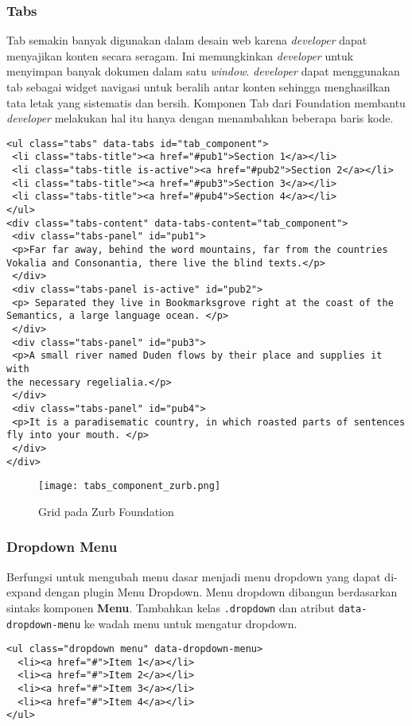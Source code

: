 \subsubsection{Tabs}
\label{subs:tabs_javascript_zurb}
Tab semakin banyak digunakan dalam desain web karena \textit{developer} dapat menyajikan konten secara seragam. Ini memungkinkan \textit{developer} untuk menyimpan banyak dokumen dalam satu \textit{window}. \textit{developer} dapat menggunakan tab sebagai widget navigasi untuk beralih antar konten sehingga menghasilkan tata letak yang sistematis dan bersih. Komponen Tab dari Foundation membantu \textit{developer} melakukan hal itu hanya dengan menambahkan beberapa baris kode. \cite{zurb:15:introfoundation}

\begin{lstlisting}[frame=single] 
<ul class="tabs" data-tabs id="tab_component">
 <li class="tabs-title"><a href="#pub1">Section 1</a></li>
 <li class="tabs-title is-active"><a href="#pub2">Section 2</a></li>
 <li class="tabs-title"><a href="#pub3">Section 3</a></li>
 <li class="tabs-title"><a href="#pub4">Section 4</a></li>
</ul>
<div class="tabs-content" data-tabs-content="tab_component">
 <div class="tabs-panel" id="pub1">
 <p>Far far away, behind the word mountains, far from the countries
Vokalia and Consonantia, there live the blind texts.</p>
 </div>
 <div class="tabs-panel is-active" id="pub2">
 <p> Separated they live in Bookmarksgrove right at the coast of the
Semantics, a large language ocean. </p>
 </div>
 <div class="tabs-panel" id="pub3">
 <p>A small river named Duden flows by their place and supplies it with
the necessary regelialia.</p>
 </div>
 <div class="tabs-panel" id="pub4">
 <p>It is a paradisematic country, in which roasted parts of sentences
fly into your mouth. </p>
 </div>
</div>
\end{lstlisting}

\begin{figure} [H]
	\centering  
	\texttt{[image: tabs\_component\_zurb.png]}  
	\caption{Grid pada Zurb Foundation}
	\label{fig:gridbasic_zurb} 
\end{figure}

\subsubsection{Dropdown Menu}
\label{subs:dropdown_javascript_zurb}
Berfungsi untuk mengubah menu dasar menjadi menu dropdown yang dapat di-expand dengan plugin Menu Dropdown.
Menu dropdown dibangun berdasarkan sintaks komponen \textbf{Menu}. Tambahkan kelas \texttt{.dropdown} dan atribut \texttt{data-dropdown-menu} ke wadah menu untuk mengatur dropdown. \cite{zurbfoundation:17}
\begin{lstlisting}[frame=single] 
<ul class="dropdown menu" data-dropdown-menu>
  <li><a href="#">Item 1</a></li>
  <li><a href="#">Item 2</a></li>
  <li><a href="#">Item 3</a></li>
  <li><a href="#">Item 4</a></li>
</ul>
\end{lstlisting}

